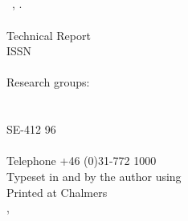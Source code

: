 


\quad \vfill

\noindent
\textbf{\lictitle}\\
{\licsubtitle}\\
\textsc{\licauthor}\\
\\
\textcopyright\ \licauthor, \licyear.\\
\\
Technical Report \TODO{\lictechreportno}\\
ISSN \licissn\\
\\
Research groups: \licresearchgroup\\
\licdepartment\\
\textsc{\licuniversity}\\
SE-412 96 \liccity \\
\liccountry\\
Telephone +46 (0)31-772 1000\\

\noindent
Typeset in \mainfontfamily{} and \monofontfamily{} by the author using \XeTeX\\
Printed at Chalmers \\ %
\liccity, \liccountry ~\licyear

